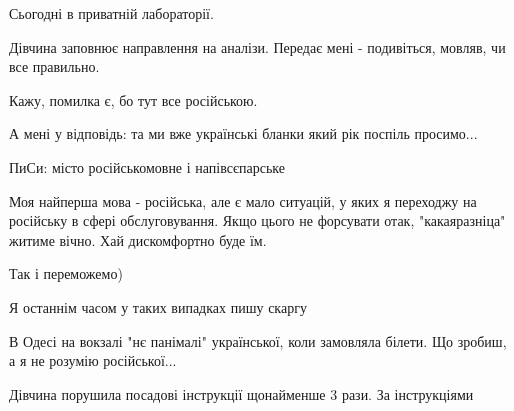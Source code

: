\begin{itemize}
 

Сьогодні в приватній лабораторії.

Дівчина заповнює направлення на аналізи. Передає мені - подивіться, мовляв, чи
все правильно.

Кажу, помилка є, бо тут все російською.

А мені у відповідь: та ми вже українські бланки який рік поспіль просимо...

ПиСи: місто російськомовне і напівсєпарське


 

Моя найперша мова - російська, але є мало ситуацій, у яких я переходжу на
російську в сфері обслуговування. Якщо цього не форсувати отак, "какаяразніца"
житиме вічно. Хай дискомфортно буде їм.

Так і переможемо)


 
Я останнім часом у таких випадках пишу скаргу

 
В Одесі на вокзалі "нє панімалі" української, коли замовляла білети. Що зробиш, а я не розумію російської...

 
Дівчина порушила посадові інструкції щонайменше 3 рази. За інструкціями


\end{itemize}
